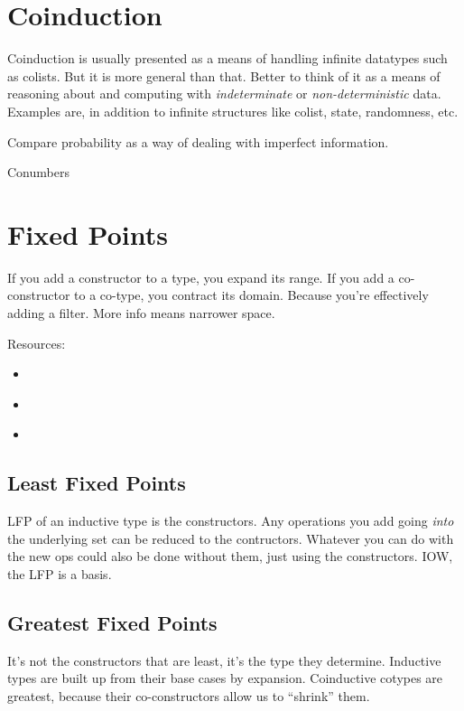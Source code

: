\documentclass{article}
\begin{document}
\section{Coinduction}

Coinduction is usually presented as a means of handling infinite
datatypes such as colists. But it is more general than that. Better to
think of it as a means of reasoning about and computing with
\textit{indeterminate} or \textit{non-deterministic} data. Examples
are, in addition to infinite structures like colist, state,
randomness, etc.

Compare probability as a way of dealing with imperfect information.

Conumbers


\section{Fixed Points}

If you add a constructor to a type, you expand its range. If you add a
co-constructor to a co-type, you contract its domain. Because you're
effectively adding a filter.  More info means narrower space.

Resources:

\begin{itemize}
\item {} \cite{lawvere1997conceptual}
\item {} \cite{davey2002introduction}
\item {} \cite{stoy1977denotational}
\end{itemize}

\subsection{Least Fixed Points}

LFP of an inductive type is the constructors. Any operations you add
going \textit{into} the underlying set can be reduced to the
contructors. Whatever you can do with the new ops could also be done
without them, just using the constructors. IOW, the LFP is a basis.

\subsection{Greatest Fixed Points}

It's not the constructors that are least, it's the type they
determine. Inductive types are built up from their base cases by
expansion. Coinductive cotypes are greatest, because their
co-constructors allow us to ``shrink'' them.
\end{document}

